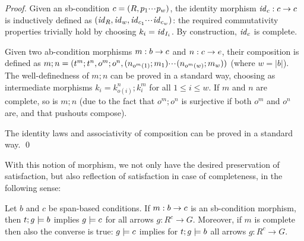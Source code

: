 \begin{proof}
  Given an sb-condition $c=(R,p_1{\cdotp\mkern-2mu\cdotp\mkern-2mu\cdotp\mkern1mu} p_w)$, the identity morphism $\mathit{id}_c:c\rightarrow c$ is inductively defined as $(\mathit{id}_R,\mathit{id}_w,\mathit{id}_{c_1}{\cdotp\mkern-2mu\cdotp\mkern-2mu\cdotp\mkern1mu} \mathit{id}_{c_w})$: the required commutativity properties trivially hold by choosing $k_i=\mathit{id}_{I_i}$. By construction, $\mathit{id}_c$ is complete.
  
Given two ab-condition morphisms $m:b\rightarrow c$ and $n:c\rightarrow e$, their composition is defined as $m;n=(t^m;t^n,o^m;o^n,(n_{o^m(1)};m_1){\cdotp\mkern-2mu\cdotp\mkern-2mu\cdotp\mkern1mu} (n_{o^m(w)};m_{w}))$ (where $w=|b|$).
The well-definedness of $m;n$ can be proved in a standard way, choosing as intermediate morphisms $k_i=k^n_{o(i)};k^m_i$ for all $1\leq i\leq w$. If $m$ and $n$ are complete, so is $m;n$ (due to the fact that $o^m;o^n$ is surjective if both $o^m$ and $o^n$ are, and that pushouts compose).

The identity laws and associativity of composition can be proved in a standard way. \qed
\end{proof}
%
With this notion of morphism, we not only have the desired preservation of satisfaction, but also reflection of satisfaction in case of completeness, in the following sense:
%
\begin{proposition}
Let $b$ and $c$ be span-based conditions. If $m:b\rightarrow c$ is an sb-condition morphism, then $t;g\models b$ implies $g\models c$ for all arrows $g:R^c\to G$. Moreover, if $m$ is complete then also the converse is true: $g\models c$ implies for $t;g\models b$ all arrows $g:R^c\to G$.
\end{proposition}
%

